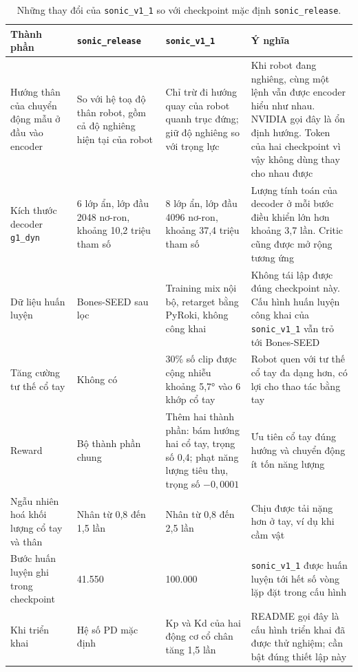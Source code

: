 \documentclass[12pt,a4paper,oneside]{report}
\newcommand{\code}[1]{\texttt{#1}}
\begin{document}
\begin{table}[htbp]
\centering\footnotesize
\caption[Những thay đổi của \code{sonic\_v1\_1} so với checkpoint mặc định]{Những thay đổi của \code{sonic\_v1\_1} so với checkpoint mặc định \code{sonic\_release}.}
\label{tab:v11_diff}
\begin{tabular}{L{3.0cm}L{3.0cm}L{3.4cm}L{4.8cm}}
\toprule
\textbf{Thành phần} & \textbf{\code{sonic\_release}} & \textbf{\code{sonic\_v1\_1}} & \textbf{Ý nghĩa}\\
\midrule
Hướng thân của chuyển động mẫu ở đầu vào encoder & So với hệ toạ độ thân robot, gồm cả độ nghiêng hiện tại của robot & Chỉ trừ đi hướng quay của robot quanh trục đứng; giữ độ nghiêng so với trọng lực & Khi robot đang nghiêng, cùng một lệnh vẫn được encoder hiểu như nhau. NVIDIA gọi đây là ổn định hướng. Token của hai checkpoint vì vậy không dùng thay cho nhau được\\
Kích thước decoder \code{g1\_dyn} & 6 lớp ẩn, lớp đầu 2048 nơ-ron, khoảng 10,2 triệu tham số & 8 lớp ẩn, lớp đầu 4096 nơ-ron, khoảng 37,4 triệu tham số & Lượng tính toán của decoder ở mỗi bước điều khiển lớn hơn khoảng 3,7 lần. Critic cũng được mở rộng tương ứng\\
Dữ liệu huấn luyện & Bones-SEED sau lọc & Training mix nội bộ, retarget bằng PyRoki, không công khai & Không tái lập được đúng checkpoint này. Cấu hình huấn luyện công khai của \code{sonic\_v1\_1} vẫn trỏ tới Bones-SEED\\
Tăng cường tư thế cổ tay & Không có & 30\% số clip được cộng nhiễu khoảng 5,7° vào 6 khớp cổ tay & Robot quen với tư thế cổ tay đa dạng hơn, có lợi cho thao tác bằng tay\\
Reward & Bộ thành phần chung & Thêm hai thành phần: bám hướng hai cổ tay, trọng số 0,4; phạt năng lượng tiêu thụ, trọng số $-0{,}0001$ & Ưu tiên cổ tay đúng hướng và chuyển động ít tốn năng lượng\\
Ngẫu nhiên hoá khối lượng cổ tay và thân & Nhân từ 0,8 đến 1,5 lần & Nhân từ 0,8 đến 2,5 lần & Chịu được tải nặng hơn ở tay, ví dụ khi cầm vật\\
Bước huấn luyện ghi trong checkpoint & 41.550 & 100.000 & \code{sonic\_v1\_1} được huấn luyện tới hết số vòng lặp đặt trong cấu hình\\
Khi triển khai & Hệ số PD mặc định & Kp và Kd của hai động cơ cổ chân tăng 1,5 lần & README gọi đây là cấu hình triển khai đã được thử nghiệm; cần bật đúng thiết lập này\\
\bottomrule
\end{tabular}
\end{table}
\end{document}
